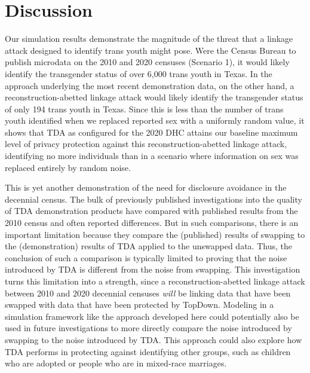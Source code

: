 \documentclass{jpc} %
\theoremstyle{plain}\newtheorem{satz}[thm]{Satz} %
\begin{document}
\section{Discussion}

    Our simulation results demonstrate the magnitude of the threat that a linkage attack designed to identify trans youth might pose.  Were the Census Bureau to publish microdata on the 2010 and 2020 censuses (Scenario 1), it would likely identify the transgender status of over 6,000 trans youth in Texas.  In the approach underlying the most recent demonstration data, on the other hand, a reconstruction-abetted linkage attack would likely identify the transgender status of only 194 trans youth in Texas.  Since this is less than the number of trans youth identified when we replaced reported sex with a uniformly random value, it shows that TDA as configured for the 2020 DHC attains our baseline maximum level of privacy protection against this reconstruction-abetted linkage attack, identifying no more individuals than in a scenario where information on sex was replaced entirely by random noise.

This is yet another demonstration of the need for disclosure avoidance in the decennial census.  The bulk of previously published investigations into the quality of TDA demonstration products have compared with published results from the 2010 census and often reported differences.  But in such comparisons, there is an important limitation because they compare the (published) results of swapping to the (demonstration) results of TDA applied to the unswapped data.  Thus, the conclusion of such a comparison is typically limited to proving that the noise introduced by TDA is different from the noise from swapping.
This investigation turns this limitation into a strength, since a reconstruction-abetted linkage attack between 2010 and 2020 decennial censuses \emph{will} be linking data that have been swapped with data that have been protected by TopDown.
Modeling in a simulation framework like the approach developed here could potentially also be used in future investigations to more directly compare the noise introduced by swapping to the noise introduced by TDA.  This approach could also explore how TDA performs in protecting against identifying other groups, such as children who are adopted or people who are in mixed-race marriages.
\end{document}
